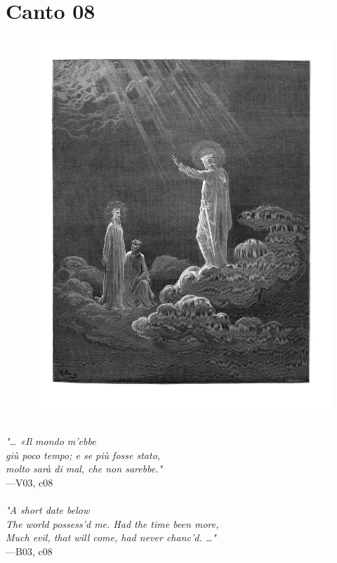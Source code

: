 \documentclass[../Dore_vision.tex]{subfiles}
\begin{document}
\newpage

\section{Canto 08}

\begin{figure}[ht]
\centering
\includegraphics[height=\figsize]{illustrations/book_3/V03, c08.jpg}
\end{figure}

\begin{center}
\begin{minipage}{0.8\linewidth}
\textit{\\
"… «Il mondo m’ebbe\\giù poco tempo; e se più fosse stato,\\molto sarà di mal, che non sarebbe."} \\
—V03, c08 \\~\\
\textit{"\textquotesingle A short date below\\The world possess'd me. Had the time been more,\\Much evil, that will come, had never chanc'd. …"} \\
—B03, c08
\end{minipage}
\end{center}
\end{document}

